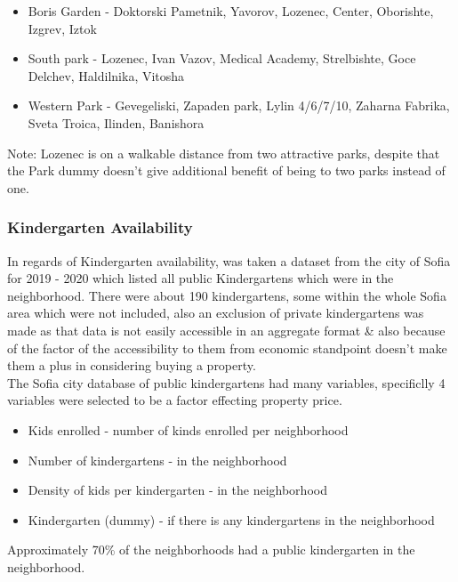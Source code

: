 \documentclass[]{article}
\begin{document}
\begin{itemize}
	\item[] Boris Garden - Doktorski Pametnik, Yavorov, Lozenec, Center,
	Oborishte, Izgrev, Iztok
	\item [] South park - Lozenec, Ivan Vazov, Medical Academy,
	Strelbishte, Goce Delchev, Haldilnika, Vitosha
	\item [] Western Park - Gevegeliski, Zapaden park,
	Lylin 4/6/7/10, Zaharna Fabrika, Sveta Troica, Ilinden, Banishora
\end{itemize}

\begin{center}
	\scriptsize
	Note: Lozenec is on a walkable distance from two attractive parks, despite that the Park dummy doesn't give additional benefit of being to two parks instead of one.  
\end{center}

\subsubsection{Kindergarten Availability}
In regards of Kindergarten availability, was taken a dataset from the city of Sofia for 2019 - 2020 which listed all public Kindergartens which were in the neighborhood. There were about 190 kindergartens, some within the whole Sofia area which were not included, also an exclusion of private kindergartens was made as that data is not easily accessible in an aggregate format \& also because of the factor of the accessibility to them from economic standpoint doesn't make them a plus in considering buying a property.\\   

The Sofia city database of public kindergartens had many variables, specificlly 4 variables were selected to be a factor effecting property price.

\begin{itemize}
	\item[] Kids enrolled - number of kinds enrolled per neighborhood
	\item[] Number of kindergartens - in the neighborhood
	\item[] Density of kids per kindergarten - in the neighborhood
	\item[] Kindergarten (dummy) - if there is any kindergartens in the neighborhood
\end{itemize}

Approximately 70\% of the neighborhoods had a public kindergarten in the neighborhood.   
\end{document}
